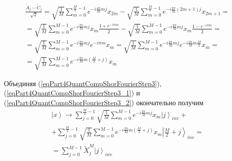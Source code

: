 \begin{eqnarray}
\frac{\tilde{A}_{j} - \tilde{C}_{j} }{\sqrt{2}} = 
\sqrt{\frac{1}{M}} 
\sum_{m = 0}^{\frac{M}{2} - 1} e^{-i \frac{4 \pi}{M} m j} x_{2m}  -
\sqrt{\frac{1}{M}} 
\sum_{m = 0}^{\frac{M}{2} - 1} 
e^{-i \frac{2 \pi}{M} \left(2m+1\right) j} x_{2m+1}
= 
\nonumber \\
=
\sqrt{\frac{1}{M}} \sum_{m = 0}^{M - 1}
e^{-i \frac{2 \pi}{M} m j} x_{m} \frac{1 + e^{-i \pi m}}{2}
-
\sqrt{\frac{1}{M}} \sum_{m = 0}^{M - 1}
e^{-i \frac{2 \pi}{M} m j} x_{m} \frac{1 - e^{-i \pi m}}{2} 
=
\nonumber \\
=
\sqrt{\frac{1}{M}} \sum_{m = 0}^{M - 1}
e^{-i \frac{2 \pi}{M} m j} e^{-i \pi m } x_{m} 
=
\sqrt{\frac{1}{M}} \sum_{m = 0}^{M - 1}
e^{-i \frac{2 \pi}{M} m j} e^{-i \frac{2 \pi}{M} m \frac{M}{2} } x_{m} 
=
\nonumber \\
=
\sqrt{\frac{1}{M}} \sum_{m = 0}^{M - 1}
e^{-i \frac{2 \pi}{M} m \left(\frac{M}{2} + j\right)} x_{m}
\label{eqPart4QuantCompShorFourierStep3_2}
\end{eqnarray}

Объединяя (\ref{eqPart4QuantCompShorFourierStep3}), 
(\ref{eqPart4QuantCompShorFourierStep3_1}) и
(\ref{eqPart4QuantCompShorFourierStep3_2}) окончательно получим 
\begin{eqnarray}
\left|x\right> \rightarrow
\sum_{j = 0}^{\frac{M}{2} - 1} \sqrt{\frac{1}{M}} \sum_{m = 0}^{M - 1}
e^{-i \frac{2 \pi}{M} m j} x_{m} \left|j\right>_{inv} +
\nonumber \\
+
\sum_{j = 0}^{\frac{M}{2} - 1} \sqrt{\frac{1}{M}} \sum_{m = 0}^{M - 1}
e^{-i \frac{2 \pi}{M} m \left(\frac{M}{2} + j\right)} x_{m} 
\left|\frac{M}{2} + j\right>_{inv} =
\nonumber \\
= \sum_{j = 0}^{M - 1} \tilde{X}_j^{M} \left|j\right>_{inv}
\nonumber
\end{eqnarray}
